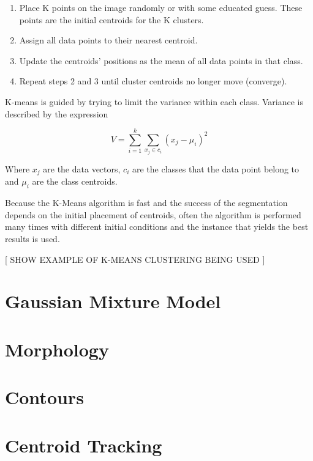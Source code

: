    \begin{enumerate}
    \itemsep0em
        \item Place K points on the image randomly or with some educated guess. These points are the initial centroids for the K clusters.  
        \item Assign all data points to their nearest centroid.
        \item Update the centroids' positions as the mean of all data points in that class.
        \item Repeat steps 2 and 3 until cluster centroids no longer move (converge). 
    \end{enumerate}

K-means is guided by trying to limit the variance within each class. Variance is described by the expression

\begin{equation}\label{eq:2}
   V = \sum_{i=1}^k\sum_{x_j\in c_i}(x_j-\mu_i)^2 
\end{equation}

Where {$x_j$} are the data vectors, $c_i$ are the classes that the data point belong to and $\mu_i$ are the class centroids.

Because the K-Means algorithm is fast and the success of the segmentation depends on the initial placement of centroids, often the algorithm is performed many times with different initial conditions and the instance that yields the best results is used. 


[ SHOW EXAMPLE OF K-MEANS CLUSTERING BEING USED ]
\section{Gaussian Mixture Model}


\section{Morphology}

\section{Contours}

\section{Centroid Tracking}


